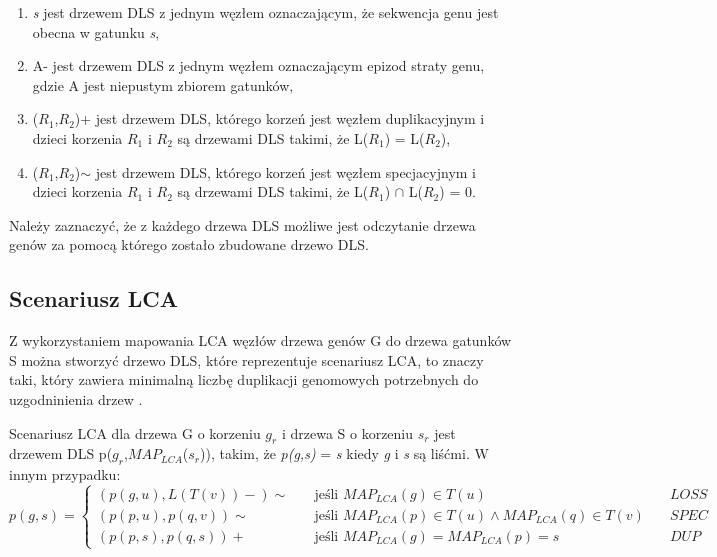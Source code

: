 \documentclass[licencjacka]{pracamgr}
\begin{document}
\begin{enumerate}
\item \textit{s} jest drzewem DLS z jednym węzłem oznaczającym, że sekwencja genu jest obecna w gatunku \textit{s},
\item  A- jest drzewem DLS z jednym węzłem oznaczającym epizod straty genu, gdzie A jest niepustym zbiorem gatunków,
\item ($R_1$,$R_2$)+ jest drzewem DLS, którego korzeń jest węzłem duplikacyjnym i dzieci korzenia $R_1$ i $R_2$ są drzewami DLS takimi, że L($R_1$) = L($R_2$),
\item ($R_1$,$R_2$)$\sim$ jest drzewem DLS, którego korzeń jest węzłem specjacyjnym i dzieci korzenia $R_1$ i $R_2$ są drzewami DLS takimi, że L($R_1$) $\cap$ L($R_2$) = 0.
\end{enumerate}

Należy zaznaczyć, że z każdego drzewa DLS możliwe jest odczytanie drzewa genów za pomocą którego zostało zbudowane drzewo DLS.


\subsection{Scenariusz LCA}

Z wykorzystaniem mapowania LCA węzłów drzewa genów G do drzewa gatunków S można stworzyć drzewo DLS, które reprezentuje scenariusz LCA, to znaczy taki, który zawiera minimalną liczbę duplikacji genomowych potrzebnych do uzgodninienia drzew \cite{dowod}.

Scenariusz LCA dla drzewa G o korzeniu $g_r$ i drzewa S o korzeniu $s_r$ jest drzewem DLS p($g_r$,$MAP_{LCA}$($s_r$)), takim, że \textit{p(g,s)} = \textit{s} kiedy \textit{g} i \textit{s} są liśćmi. W innym przypadku:
\[ p(g,s) =
  \begin{cases}
    (p(g,u),L(T(v))-)\sim & \quad \text{jeśli } MAP_{LCA}(g) \in T(u) & \quad LOSS\\
    (p(p,u),p(q,v))\sim & \quad \text{jeśli } MAP_{LCA}(p) \in T(u)\wedge MAP_{LCA}(q) \in T(v)& \quad SPEC\\
    (p(p,s),p(q,s))+ & \quad \text{jeśli } MAP_{LCA}(g) = MAP_{LCA}(p) = s & \quad DUP
  \end{cases}
\]
\end{document}
